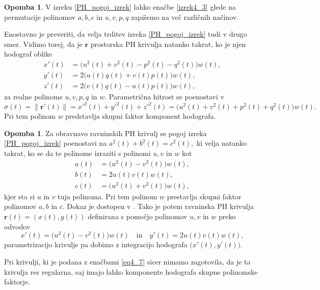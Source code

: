 \documentclass[12pt,a4paper,twoside]{article}
\theoremstyle{definition} %
\newtheorem{opomba}[definicija]{Opomba}
\theoremstyle{plain} %
\theoremstyle{primerstyle}
\numberwithin{equation}{section}  %
\newcommand{\rV}{\mathbf{r}}
\begin{document}
\begin{opomba}
	\label{opomba_PH_pogoj_izrek}
	V izreku \ref{PH_pogoj_izrek} lahko enačbe \eqref{izrek4_3} glede na permutacije polinomov $a,b,c$ in $u,v,p,q$ zapišemo na več različnih načinov.
\end{opomba}
Enostavno je preveriti, da velja trditev izreka \ref{PH_pogoj_izrek} tudi v drugo smer. Vidimo torej, da je $\rV$ prostorska PH krivulja natanko takrat, ko je njen hodograf oblike
	\begin{align}
		x'(t)&=\big(u^2(t)+v^2(t)-p^2(t)-q^2(t)\big)w(t), \nonumber \\
		y'(t)&=2\big(u(t)q(t)+v(t)p(t)\big)w(t), \label{eq4_7} \\
		z'(t)&=2\big(v(t)q(t)-u(t)p(t)\big)w(t), \nonumber
	\end{align}
	za realne polinome $u,v,p,q$ in $w.$ Parametrična hitrost se poenostavi v
	\begin{equation}
		\label{eq4_8}
		\sigma(t)=\lVert\rV'(t)\rVert=x'^2(t)+y'^2(t)+z'^2(t)=\big(u^2(t)+v^2(t)+p^2(t)+q^2(t)\big)w(t).
	\end{equation}
	Pri tem polinom $w$ predstavlja skupni faktor komponent hodografa.
\begin{opomba}
	\label{opomba1}
	Za obravnavo ravninskih PH krivulj se pogoj izreka \ref{PH_pogoj_izrek} poenostavi na $a^2(t)+b^2(t)=c^2(t),$ ki velja natanko takrat, ko se da te polinome izraziti s polinomi $u,v$ in $w$ kot
	\begin{align}
		a(t)&=\big(u^2(t)-v^2(t)\big)w(t),\nonumber\\
		b(t)&=2u(t)v(t)w(t),\label{ravninska_PH}\\
		c(t)&=\big(u^2(t)+v^2(t)\big)w(t),\nonumber
	\end{align}
	kjer sta si $u$ in $v$ tuja polinoma. Pri tem polinom $w$ prestavlja skupni faktor polinomov $a,b$ in $c.$ Dokaz je dostopen v \cite[str.\ 382]{farouki2008pythagorean}. Tako je potem ravninska PH krivulja $\rV(t)=(x(t),y(t))$ definirana s pomočjo polinomov $u,v$ in $w$ preko odvodov
	\begin{equation}
		\label{poly_ravninska_PH}
		x'(t)=\big(u^2(t)-v^2(t)\big)w(t)\quad\text{in}\quad y'(t)=2u(t)v(t)w(t),
	\end{equation}
	parametrizacijo krivulje pa dobimo z integracijo hodografa $\big(x'(t),y'(t)\big).$
\end{opomba}

Pri krivulji, ki je podana z enačbami \eqref{eq4_7} sicer nimamo zagotovila, da je ta krivulja res regularna, saj imajo lahko komponente hodografa skupne polinomske faktorje.
\end{document}
